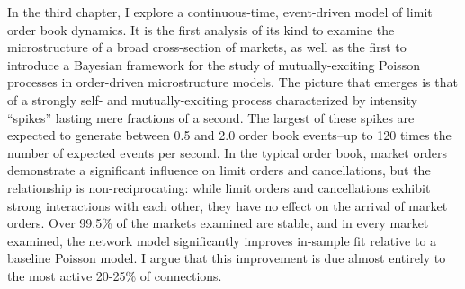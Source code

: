 In the third chapter, I explore a continuous-time, event-driven model of limit order book dynamics. It is the first analysis of its kind to examine the microstructure of a broad cross-section of markets, as well as the first to introduce a Bayesian framework for the study of mutually-exciting Poisson processes in order-driven microstructure models. The picture that emerges is that of a strongly self- and mutually-exciting process characterized by intensity ``spikes'' lasting mere fractions of a second. The largest of these spikes are expected to generate between 0.5 and 2.0 order book events--up to 120 times the number of expected events per second. In the typical order book, market orders demonstrate a significant influence on limit orders and cancellations, but the relationship is non-reciprocating: while limit orders and cancellations exhibit strong interactions with each other, they have no effect on the arrival of market orders. Over 99.5\% of the markets examined are stable, and in every market examined, the network model significantly improves in-sample fit relative to a baseline Poisson model. I argue that this improvement is due almost entirely to the most active 20-25\% of connections.
